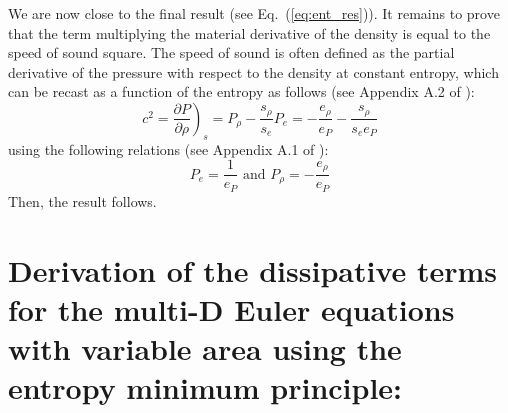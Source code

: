 \documentclass[preprint,10pt]{elsarticle}
\newcommand{\eqt}[1]{Eq.~(\ref{#1})}                     %
\begin{document}
%
We are now close to the final result (see \eqt{eq:ent_res}). It remains to prove that the term multiplying the material derivative of the density is equal to the speed of sound square. The speed of sound is often defined as the partial derivative of the pressure with respect to the density at constant entropy, which can be recast as a function of the entropy as follows (see Appendix A.2 of \cite{jlg}):
%
\begin{equation}
c^2 = \left. \frac{\partial P}{\partial \rho} \right)_s = P_{\rho} - \frac{s_{\rho}}{s_e} P_e = - \frac{e_{\rho}}{e_P} - \frac{s_{\rho}}{s_e e_P} \nonumber
\end{equation}
%
using the following relations (see Appendix A.1 of \cite{jlg}):
%
\begin{equation}
P_e = \frac{1}{e_P} \text{ and } P_{\rho} = -\frac{e_{\rho}}{e_P} \nonumber
\end{equation}
%
Then, the result follows.

\newpage
\section{Derivation of the dissipative terms for the multi-D Euler equations with variable area using the entropy minimum principle:} \label{app:diss_terms}
\end{document}
